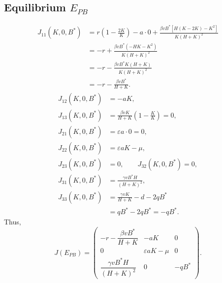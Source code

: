 \documentclass[11pt]{article}
\begin{document}
\subsection{Equilibrium $E_{PB}$}

\begin{align*}
    J_{11}(K,0,B^*)
        &= r\left(1-\frac{2K}{K}\right)-a\cdot 0
        +\frac{\beta vB^*\left[H(K-2K)-K^2\right]}{K(H+K)^2} \\
        &= -r+\frac{\beta vB^*(-HK-K^2)}{K(H+K)^2} \\
        &= -r-\frac{\beta vB^*K(H+K)}{K(H+K)^2} \\
        &= -r-\frac{\beta vB^*}{H+K}.
\end{align*}
\begin{align*}
    J_{12}(K,0,B^*) &= -aK, \\
    J_{13}(K,0,B^*)
        &= \frac{\beta vK}{H+K}\left(1-\frac{K}{K}\right)=0, \\
    J_{21}(K,0,B^*) &= \varepsilon a\cdot 0=0, \\
    J_{22}(K,0,B^*) &= \varepsilon aK-\mu, \\
    J_{23}(K,0,B^*) &= 0,\qquad J_{32}(K,0,B^*)=0, \\
    J_{31}(K,0,B^*) &= \frac{\gamma vB^*H}{(H+K)^2}, \\
    J_{33}(K,0,B^*) &= \frac{\gamma vK}{H+K}-d-2qB^* \\
        &= qB^*-2qB^*=-qB^*.
\end{align*}
Thus,
\[
    J(E_{PB})=
    \begin{pmatrix}
        -r-\dfrac{\beta vB^*}{H+K} & -aK & 0 \\[12pt]
        0 & \varepsilon aK-\mu & 0 \\[12pt]
        \dfrac{\gamma vB^*H}{(H+K)^2} & 0 & -qB^*
    \end{pmatrix}.
\]
\end{document}
